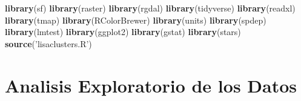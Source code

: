 \documentclass[11pt,]{article}
\newenvironment{Shaded}{\begin{snugshade}}{\end{snugshade}}
\newcommand{\KeywordTok}[1]{\textcolor[rgb]{0.13,0.29,0.53}{\textbf{#1}}}
\newcommand{\DataTypeTok}[1]{\textcolor[rgb]{0.13,0.29,0.53}{#1}}
\newcommand{\DecValTok}[1]{\textcolor[rgb]{0.00,0.00,0.81}{#1}}
\newcommand{\StringTok}[1]{\textcolor[rgb]{0.31,0.60,0.02}{#1}}
\newcommand{\OperatorTok}[1]{\textcolor[rgb]{0.81,0.36,0.00}{\textbf{#1}}}
\newcommand{\NormalTok}[1]{#1}
\begin{document}
\begin{Shaded}
\begin{Highlighting}[]
\KeywordTok{library}\NormalTok{(sf)}
\KeywordTok{library}\NormalTok{(raster)}
\KeywordTok{library}\NormalTok{(rgdal)}
\KeywordTok{library}\NormalTok{(tidyverse)}
\KeywordTok{library}\NormalTok{(readxl)}
\KeywordTok{library}\NormalTok{(tmap)}
\KeywordTok{library}\NormalTok{(RColorBrewer)}
\KeywordTok{library}\NormalTok{(units)}
\KeywordTok{library}\NormalTok{(spdep)}
\KeywordTok{library}\NormalTok{(lmtest)}
\KeywordTok{library}\NormalTok{(ggplot2)}
\KeywordTok{library}\NormalTok{(gstat)}
\KeywordTok{library}\NormalTok{(stars)}
\KeywordTok{source}\NormalTok{(}\StringTok{'lisaclusters.R'}\NormalTok{)}
\end{Highlighting}
\end{Shaded}

\section{Analisis Exploratorio de los
Datos}\label{analisis-exploratorio-de-los-datos}

\begin{Shaded}
\end{Shaded}
\end{document}
